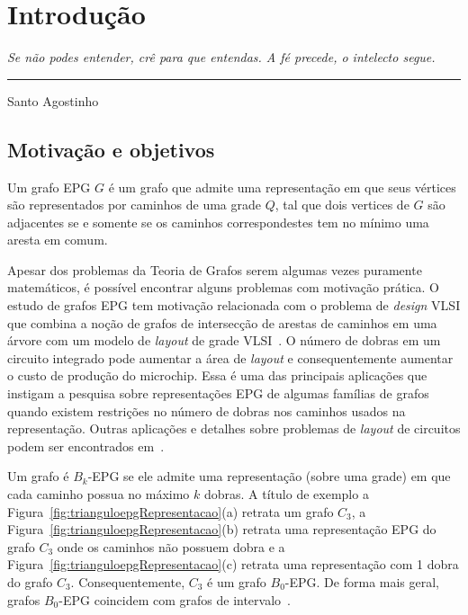 \chapter{Introdução}

\begin{flushright}
\begin{minipage}[t][0cm][b]{0.47\textwidth}
\emph{Se não podes entender, crê para que entendas. A fé precede, o intelecto segue.}
\end{minipage}

\rule[0cm]{7cm}{0.03cm}%

Santo Agostinho
\end{flushright}


\section{Motivação e objetivos}

Um grafo EPG $G$ é um grafo que admite uma representação em que seus vértices são representados por caminhos de uma grade $Q$, tal que dois vertices de $G$ são adjacentes se e somente se os caminhos correspondestes tem no mínimo uma aresta em comum.

Apesar dos problemas da Teoria de Grafos serem algumas vezes puramente matemáticos, é possível encontrar alguns problemas com motivação prática. O estudo de grafos EPG tem motivação relacionada com o problema de \textit{design} VLSI que combina a noção de grafos de intersecção de arestas de caminhos em uma árvore com um modelo de \textit{layout} de grade VLSI~\cite{golumbic2009}. O número de dobras em um circuito integrado pode aumentar a área de \textit{layout} e consequentemente aumentar o custo de produção do microchip. 
Essa é uma das principais aplicações que instigam a  pesquisa sobre representações EPG de algumas famílias de grafos quando existem restrições no número de dobras nos caminhos usados na representação.
Outras aplicações e detalhes sobre problemas de \textit{layout} de circuitos podem ser encontrados em~\cite{bandy1990, molitor1991}.   

Um grafo é $ B_k$-EPG se ele admite uma representação (sobre uma grade) em que cada caminho possua no máximo $k$ dobras. A título de exemplo a Figura~\ref{fig:trianguloepgRepresentacao}(a) retrata um grafo $C_3$, a Figura~\ref{fig:trianguloepgRepresentacao}(b) retrata uma representação EPG do grafo $C_3$ onde os caminhos não possuem dobra e a  Figura~\ref{fig:trianguloepgRepresentacao}(c) retrata uma representação com 1 dobra do grafo $C_3$. Consequentemente, $C_3$ é um grafo  $B_0$-EPG. De forma mais geral, grafos $B_0$-EPG coincidem com grafos de intervalo~\cite{golumbic2009}.

